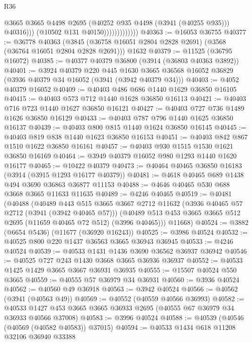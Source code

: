 \begin{lexlean}{R36}
\begin{coremodule}
                                  @3665
                                  @3665
                                  @4498
                                  @2695
                                  (@40252 @935 @4498 (@3941 (@40255 @935)))
                                  @40316)))
                            (@10502 @131 @40150)))))))))))))
@40363 := @16053 @36755
@40377 := @36778
    @40363
    (@3845 (@36758 @16051 @2804 @2828 @2691) (@3568 (@36764 @16051 @2804 @2828 @2691)))
    @1632
@40379 := @11525 (@36795 @16072)
@40385 := @40377 @40379 @36800 (@3914 (@36803 @40363 @3892))
@40401 := @3924
    @40379
    @220
    @445
    @1630
    @3665
    @36568
    @16052
    @36829
    (@3936 @40379 @34 @16052 (@3941 (@3942 @40379 @34)))
@40403 := @4052 @40379 @16052
@40409 := @40403 @486 @686 @1440 @1629 @36850 @16105
@40415 := @40403 @573 @712 @1440 @1628 @36850 @16113
@40421 := @40403 @716 @723 @1440 @1627 @36850 @16121
@40427 := @40403 @727 @736 @1489 @1626 @36850 @16129
@40433 := @40403 @787 @796 @1440 @1625 @36850 @16137
@40439 := @40403 @800 @815 @1440 @1624 @36850 @16145
@40445 := @40403 @819 @838 @1440 @1623 @36850 @16153
@40451 := @40403 @842 @867 @1510 @1622 @36850 @16161
@40457 := @40403 @930 @1515 @1530 @1621 @36850 @16169
@40464 := @3949 @40379 @16052 @980 @1293 @1440 @1620 @16177
@40465 := @10422 @40379
@40473 := @40464 @40465 @36850 @16183 (@3914 (@3915 @1293 @16177 @40379))
@40481 := @4618 @40465 @689 @1438 @494 @3690 @36863 @36877 @11153
@40488 := @4646 @40465 @530 @688 @3668 @3665 @11633 @11635
@40489 := @4246 @40465
@40519 := @40481
    (@40488
      (@40489
        @443
        @515
        @3665
        @3667
        @2712
        @11632
        (@3936 @40465 @57 @2712 (@3941 (@3942 @40465 @57)))
        (@40489 @513 @453 @3665 @3665 @512 @2695 (@11659 @40465 @72 @512) (@3996 @40465)))
      @11668)
@40524 := @3882 (@6654 @5436) (@11677 (@36920 @16243))
@40525 := @3986 @40524
@40532 := @40525 @800 @220 @1437 @36563 @3665 @36943 @36945
@40533 := @4246 @40524
@40539 := @40533 @1431 @1436 @3690 @36562 @36937 @36942
@40546 := @40525 @727 @243 @1430 @3668 @3665 @36936 @36937
@40552 := @40533 @1425 @1429 @3665 @3667 @36931 @36935
@40555 := @15507 @40524 @550 @3665
@40559 := @40555 @57 @36979 @34 @36931
@40560 := @3936 @40524
@40562 := @40560 @49 @36918
@40563 := @3942 @40524
@40566 := @40562 (@3941 (@40563 @49))
@40569 := @40552 (@40559 @40566 @36993)
@40582 := @40533 @1427 @453 @3665 @3665 @36933 @2695 (@40555 @67 @36979 @34 @36933 @40566 @37008)
@40583 := @3996 @40524
@40588 := @40539 (@40546 (@40569 (@40582 @40583)) @37015)
@40594 := @40533 @1434 @618 @11208 @32106 @36940 @33388

\end{coremodule}
\end{lexlean}
